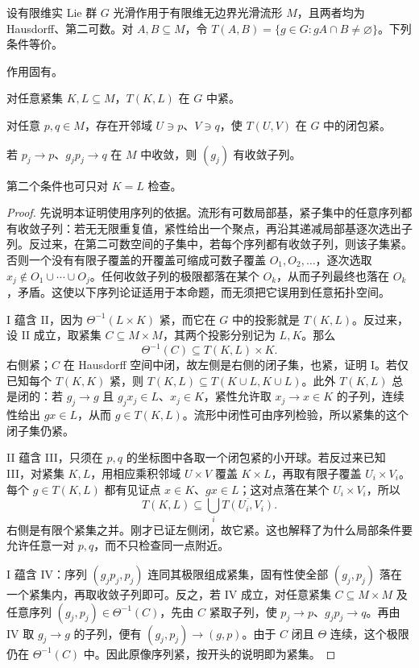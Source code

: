 \begin{proposition}\label{g1:prop:proper-action-criteria}
	设有限维实 Lie 群 \(G\) 光滑作用于有限维无边界光滑流形 \(M\)，且两者均为 Hausdorff、第二可数。对 \(A,B\subseteq M\)，令 \(T(A,B)=\{g\in G:gA\cap B\ne\varnothing\}\)。下列条件等价。
	\begin{equivalences}
		\item 作用固有。
		\item 对任意紧集 \(K,L\subseteq M\)，\(T(K,L)\) 在 \(G\) 中紧。
		\item 对任意 \(p,q\in M\)，存在开邻域 \(U\ni p\)、\(V\ni q\)，使 \(T(U,V)\) 在 \(G\) 中的闭包紧。
		\item 若 \(p_j\to p\)、\(g_jp_j\to q\) 在 \(M\) 中收敛，则 \((g_j)\) 有收敛子列。
	\end{equivalences}
	第二个条件也可只对 \(K=L\) 检查。
\end{proposition}
\begin{proof}
	先说明本证明使用序列的依据。流形有可数局部基，紧子集中的任意序列都有收敛子列：若无无限重复值，紧性给出一个聚点，再沿其递减局部基逐次选出子列。反过来，在第二可数空间的子集中，若每个序列都有收敛子列，则该子集紧。否则一个没有有限子覆盖的开覆盖可缩成可数子覆盖 \(O_1,O_2,\ldots\)，逐次选取 \(x_j\notin O_1\cup\cdots\cup O_j\)。任何收敛子列的极限都落在某个 \(O_k\)，从而子列最终也落在 \(O_k\)，矛盾。这使以下序列论证适用于本命题，而无须把它误用到任意拓扑空间。

	I 蕴含 II，因为 \(\Theta^{-1}(L\times K)\) 紧，而它在 \(G\) 中的投影就是 \(T(K,L)\)。反过来，设 II 成立，取紧集 \(C\subseteq M\times M\)，其两个投影分别记为 \(L,K\)。那么
	\[
		\Theta^{-1}(C)\subseteq T(K,L)\times K.
	\]
	右侧紧；\(C\) 在 Hausdorff 空间中闭，故左侧是右侧的闭子集，也紧，证明 I。若仅已知每个 \(T(K,K)\) 紧，则 \(T(K,L)\subseteq T(K\cup L,K\cup L)\)。此外 \(T(K,L)\) 总是闭的：若 \(g_j\to g\) 且 \(g_jx_j\in L\)、\(x_j\in K\)，紧性允许取 \(x_j\to x\in K\) 的子列，连续性给出 \(gx\in L\)，从而 \(g\in T(K,L)\)。流形中闭性可由序列检验，所以紧集的这个闭子集仍紧。

	II 蕴含 III，只须在 \(p,q\) 的坐标图中各取一个闭包紧的小开球。若反过来已知 III，对紧集 \(K,L\)，用相应乘积邻域 \(U\times V\) 覆盖 \(K\times L\)，再取有限子覆盖 \(U_i\times V_i\)。每个 \(g\in T(K,L)\) 都有见证点 \(x\in K\)、\(gx\in L\)；这对点落在某个 \(U_i\times V_i\)，所以
	\[
		T(K,L)\subseteq\bigcup_i\overline{T(U_i,V_i)}.
	\]
	右侧是有限个紧集之并。刚才已证左侧闭，故它紧。这也解释了为什么局部条件要允许任意一对 \(p,q\)，而不只检查同一点附近。

	I 蕴含 IV：序列 \((g_jp_j,p_j)\) 连同其极限组成紧集，固有性使全部 \((g_j,p_j)\) 落在一个紧集内，再取收敛子列即可。反之，若 IV 成立，对任意紧集 \(C\subseteq M\times M\) 及任意序列 \((g_j,p_j)\in\Theta^{-1}(C)\)，先由 \(C\) 紧取子列，使 \(p_j\to p\)、\(g_jp_j\to q\)。再由 IV 取 \(g_j\to g\) 的子列，便有 \((g_j,p_j)\to(g,p)\)。由于 \(C\) 闭且 \(\Theta\) 连续，这个极限仍在 \(\Theta^{-1}(C)\) 中。因此原像序列紧，按开头的说明即为紧集。
\end{proof}

